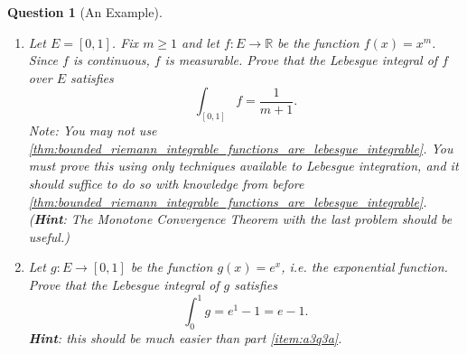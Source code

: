\documentclass[notoc,notitlepage]{tufte-book}
\newtheorem{assgprob}{Question}[section]
\begin{document}
\begin{assgprob}[An Example]
  \begin{enumerate}
    \item \label{item:a3q3a}
      Let $E = [0, 1]$. Fix $m \geq 1$ and let $f : E \to \mathbb{R}$
      be the function $f(x) = x^m$.
      Since $f$ is continuous, $f$ is measurable.
      Prove that the Lebesgue integral of $f$ over $E$ satisfies
      \begin{equation*}
        \int_{[0, 1]} f = \frac{1}{m + 1}.
      \end{equation*}
      Note: You may not use
      \cref{thm:bounded_riemann_integrable_functions_are_lebesgue_integrable}.
      You must prove this using only techniques available to Lebesgue
      integration, and it should suffice to do so with knowledge from before
      \cref{thm:bounded_riemann_integrable_functions_are_lebesgue_integrable}.  \linebreak
      (\textbf{Hint}: The Monotone Convergence Theorem with the last problem
      should be useful.)

    \item Let $g : E \to [0, 1]$ be the function $g(x) = e^x$, i.e.
      the exponential function.
      Prove that the Lebesgue integral of $g$ satisfies
      \begin{equation*}
        \int_{0}^{1} g = e^1 - 1 = e - 1.
      \end{equation*}
      \textbf{Hint}: this should be much easier than part \ref{item:a3q3a}.
  \end{enumerate}
\end{assgprob}
\end{document}
